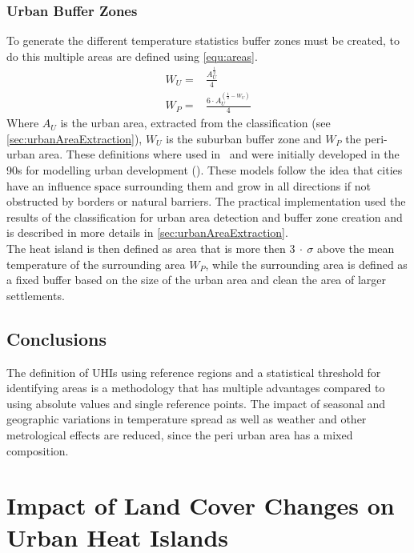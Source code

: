 \documentclass[12pt,a4paper, english,twoside]{article}
\begin{document}
    \subsubsection{Urban Buffer Zones}\label{sec:urbanBufferzone}
      To generate the different temperature statistics buffer zones must be created, to do this multiple areas are defined using \cref{equ:areas}.
%
      \begin{equation}\label{equ:areas}
        \begin{split}
          W_U = & \frac{A_U^{\frac{1}{2}}}{4} \\
          W_P = & \frac{6\cdot A_U^{(\frac{1}{2}-W_U)}}{4}
        \end{split}
      \end{equation}
      Where $A_U$ is the urban area, extracted from the classification (see \cref{sec:urbanAreaExtraction}), $W_U$ is the suburban buffer zone and $W_P$ the peri-urban area.
      These definitions where used in~\cite{Sobrino2020} and were initially developed in the 90s for modelling urban development (\cite{AlkanBala2014}).
      These models follow the idea that cities have an influence space surrounding them and grow in all directions if not obstructed by borders or natural barriers. 
      The practical implementation used the results of the classification for urban area detection and buffer zone creation and is described in more details in \cref{sec:urbanAreaExtraction}. \\
      The heat island is then defined as area that is more then $3~\cdot~\sigma$ above the mean temperature of the surrounding area $W_P$, while the surrounding area is defined as a fixed buffer based on the size of the urban area and clean the area of larger settlements. 
%
    \subsection{Conclusions}
    The definition of \glspl{UHI} using reference regions and a statistical threshold for identifying areas is a methodology that has multiple advantages compared to using absolute values and single reference points. 
    The impact of seasonal and geographic variations in temperature spread as well as weather and other metrological effects are reduced, since the peri urban area has a mixed composition. 

\newpage
\section{Impact of Land Cover Changes on Urban Heat Islands}\label{sec:LULC}
\end{document}
